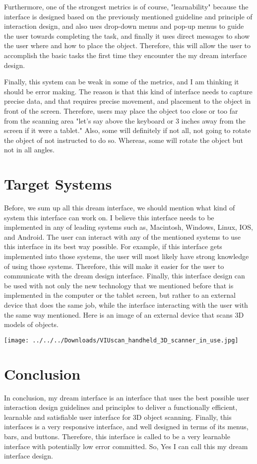 \documentclass[12pt, oneside]{amsart}   	%
\begin{document}
Furthermore, one of the strongest metrics is of course, "learnability" because the interface is designed based on the previously mentioned guideline and principle of interaction design, and also uses drop-down menus and pop-up menus to guide the user towards completing the task, and finally it uses direct messages to show the user where and how to place the object.  Therefore,  this will allow the user to accomplish the basic tasks the first time they encounter the my dream interface design.

Finally, this system can be weak in some of the metrics, and I am thinking it should be error making.  The reason is that this kind of interface needs to capture precise data, and that requires precise movement, and placement to the object in front of the screen.  Therefore, users may place the object too close or too far from the scanning area "let's say above the keyboard or 3 inches away from the screen if it were a tablet."  Also, some will definitely if not all, not going to rotate the object of not instructed to do so. Whereas, some will rotate the object but not in all angles.  

\section{Target Systems}

Before, we sum up all this dream interface, we should mention what kind of system this interface can work on.  I believe this interface needs to be implemented in any of leading systems such as, Macintosh, Windows, Linux, IOS, and Android.  The user can interact with any of the mentioned systems to use this interface in its best way possible.  For example, if this interface gets implemented into those systems, the user will most likely have strong knowledge of using those systems.  Therefore, this will make it easier for the user to communicate with the dream design interface.  Finally, this interface design can be used with not only the new technology that we mentioned before that is implemented in the computer or the tablet screen, but rather to an external device that does the same job, while the interface interacting with the user with the same way mentioned.
Here is an image of an external device that scans 3D models of objects.

\texttt{[image: ../../../Downloads/VIUscan\_handheld\_3D\_scanner\_in\_use.jpg]}


\section{Conclusion}

In conclusion, my dream interface is an interface that uses the best possible user interaction design guidelines and principles to deliver a functionally efficient, learnable and satisfiable user interface for 3D object scanning. 
Finally, this interfaces is a very responsive interface, and well designed in terms of its menus, bars, and buttons. Therefore, this interface is called to be a very learnable interface with potentially low error committed.  So, Yes I can call this my dream interface design.
\end{document}
